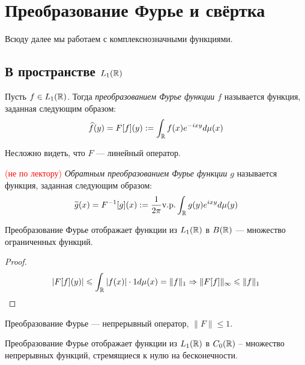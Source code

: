 \section{Преобразование Фурье и свёртка}

\begin{note}
	Всюду далее мы работаем с комплекснозначными функциями.
\end{note}

\subsection{В пространстве $L_1(\mathbb{R})$}

\begin{definition}
	Пусть $f \in L_1(\mathbb{R})$. Тогда \textit{преобразованием Фурье функции $f$} называется функция, заданная следующим образом:
	\[
		\widehat{f}(y) = F[f](y) := \int_{\mathbb{R}} f(x)e^{-ixy}d\mu(x)
	\]
\end{definition}

\begin{note}
	Несложно видеть, что $F$ --- линейный оператор.
\end{note}

\begin{definition} \textcolor{red}{(не по лектору)}
	\textit{Обратным преобразованием Фурье функции $g$} называется функция, заданная следующим образом:
	\[
		\widetilde{g}(x) = F^{-1}[g](x) := \frac{1}{2\pi} \text{v.p.} \int_{\mathbb{R}} g(y)e^{ixy}d\mu(y)
	\]
\end{definition}

\begin{proposition}
	Преобразование Фурье отображает функции из $L_1(\mathbb{R})$ в $B(\mathbb{R})$ --- множество ограниченных функций.
\end{proposition}

\begin{proof}
	\[
		\left|F[f](y)\right| \leqslant \int_{\mathbb{R}} |f(x)| \cdot 1 d\mu(x) = \|f\|_{1} \Rightarrow \|F[f]\|_\infty \leqslant \|f\|_1
	\]
\end{proof}

\begin{corollary}
	Преобразование Фурье --- непрерывный оператор, $\|F\| \le 1$.
\end{corollary}

\begin{proposition}
	Преобразование Фурье отображает функции из $L_1(\mathbb{R})$ в $C_0(\mathbb{R})$ -- множество непрерывных функций, стремящиеся к нулю на бесконечности.
\end{proposition}

